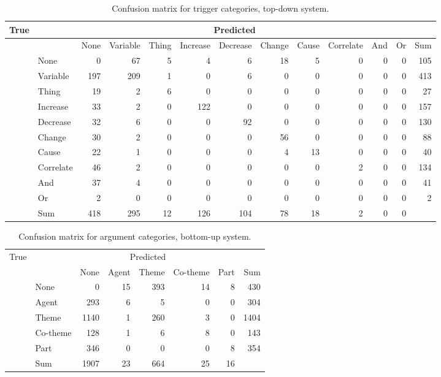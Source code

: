 \begin{sidewaystable}
\begin{center}
\begin{tabular}{ | r | l | r | r | r | r | r | r | r | r | r | r | r |}
	\hline
	\multirow{11}{*}{True} & \multicolumn{12}{c|}{Predicted} \\ \hline
	&\cellcolor{gray} & None & Variable & Thing & Increase & Decrease & Change & Cause & Correlate & And & Or & Sum\\ \cline{2-13}
	&None & \cellcolor{g} 0 & 67 & 5 & 4 & 6 & 18 & 5 & 0 & 0 & 0 & 105 \\
	&Variable & 197 & \cellcolor{g} 209 & 1 & 0 & 6 & 0 & 0 & 0 & 0 & 0 & 413 \\
	&Thing & 19 & 2 & \cellcolor{g} 6 & 0 & 0 & 0 & 0 & 0 & 0 & 0 & 27 \\
	&Increase & 33 & 2 & 0 & \cellcolor{g} 122 & 0 & 0 & 0 & 0 & 0 & 0 & 157 \\
	&Decrease & 32 & 6 & 0 & 0 & \cellcolor{g} 92 & 0 & 0 & 0 & 0 & 0 & 130 \\
	&Change & 30 & 2 & 0 & 0 & 0 & \cellcolor{g} 56 & 0 & 0 & 0 & 0 & 88 \\
	&Cause & 22 & 1 & 0 & 0 & 0 & 4 & \cellcolor{g} 13 & 0 & 0 & 0 & 40 \\
	&Correlate & 46 & 2 & 0 & 0 & 0 & 0 & 0 & \cellcolor{g} 2 & 0 & 0 & 134 \\ 
	&And & 37 & 4 & 0 & 0 & 0 & 0 & 0 & 0 & \cellcolor{g} 0 & 0 & 41 \\ 
	&Or & 2 & 0 & 0 & 0 & 0 & 0 & 0 & 0 & 0 & \cellcolor{g} 0 & 2 \\ \hline
	&Sum& 418 & 295 & 12 & 126 & 104 & 78 & 18 & 2 & 0 & 0 & \\ \hline
\end{tabular}
\end{center}
\caption{Confusion matrix for trigger categories, top-down system.}
\label{pms_trigger_conf}
\end{sidewaystable}

\begin{table}
\begin{center}
\begin{tabular}{ | l | l | r | r | r | r | r | r | }
	\hline
	\multirow{8}{*}{True} & \multicolumn{7}{c|}{Predicted} \\ \cline{1-8}
	&\cellcolor{gray} & None & Agent & Theme & Co-theme & Part & Sum \\ \cline{2-8}
	&None & \cellcolor{g} 0 & 15 & 393 & 14 & 8 & 430 \\
	&Agent & 293 & \cellcolor{g} 6 & 5 & 0 & 0 & 304 \\
	&Theme & 1140 & 1 & \cellcolor{g} 260 & 3 & 0 & 1404 \\
	&Co-theme & 128 & 1 & 6 & \cellcolor{g} 8 & 0 & 143 \\
	&Part & 346 & 0 & 0 & 0 & \cellcolor{g} 8 & 354 \\ \hline	
	& Sum & 1907 & 23 & 664 & 25 & 16 & \\ \hline
\end{tabular}
\end{center}
\caption{Confusion matrix for argument categories, bottom-up system.}
\label{tees_argument_conf}
\end{table}

